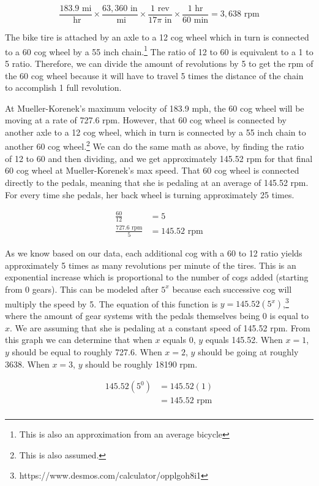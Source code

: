 \documentclass{article}
\begin{document}
$$
\frac{183.9 \text{ mi}}{\text{ hr}} \times \frac{63,360 \text{ in}}{\text{ mi}} \times \frac{1 \text{ rev}}{17\pi \text{ in}} \times \frac{1 \text{ hr}}{60 \text{ min}} = 3,638 \text{ rpm}
$$

The bike tire is attached by an axle to a 12 cog wheel which in turn is connected to a 60 cog wheel by a 55 inch chain.\footnote{This is also an approximation from an average bicycle}
The ratio of 12 to 60 is equivalent to a 1 to 5 ratio. Therefore, we can divide the amount of revolutions by 5 to get the rpm of the 60 cog wheel because it will have to travel 5 times the distance of the chain to accomplish 1 full revolution. 

At Mueller-Korenek’s maximum velocity of 183.9 mph, the 60 cog wheel will be moving at a rate of 727.6 rpm. However, that 60 cog wheel is connected by another axle to a 12 cog wheel, which in turn is connected by a 55 inch chain to another 60 cog wheel.\footnote{This is also assumed.} 
We can do the same math as above, by finding the ratio of 12 to 60 and then dividing, and we get approximately 145.52 rpm for that final 60 cog wheel at Mueller-Korenek’s max speed. That 60 cog wheel is connected directly to the pedals, meaning that she is pedaling at an average of 145.52 rpm. For every time she pedals, her back wheel is turning approximately 25 times.

\begin{align*}
\frac{60}{12} &= 5 \\
\frac{727.6 \text{ rpm}}{5} &= 145.52 \text{ rpm} 
\end{align*}

As we know based on our data, each additional cog with a 60 to 12 ratio yields approximately 5 times as many revolutions per minute of the tires. This is an exponential increase which is proportional to the number of cogs added (starting from 0 gears). This can be modeled after $5^{x}$ because each successive cog will multiply the speed by 5. The equation of this function is $y=145.52(5^{x})$,\footnote{https://www.desmos.com/calculator/opplgoh8i1} where the amount of gear systems with the pedals themselves being 0 is equal to $x$. We are assuming that she is pedaling at a constant speed of 145.52 rpm. From this graph we can determine that when $x$ equals 0, $y$ equals 145.52. When $x = 1$, $y$ should be equal to roughly 727.6. When $x = 2$, $y$ should be going at roughly 3638. When $x = 3$, $y$ should  be roughly 18190 rpm. 

\begin{align*}
145.52(5^{0}) &= 145.52(1) \\
&= 145.52 \text{ rpm} \\
\end{align*}
\end{document}
